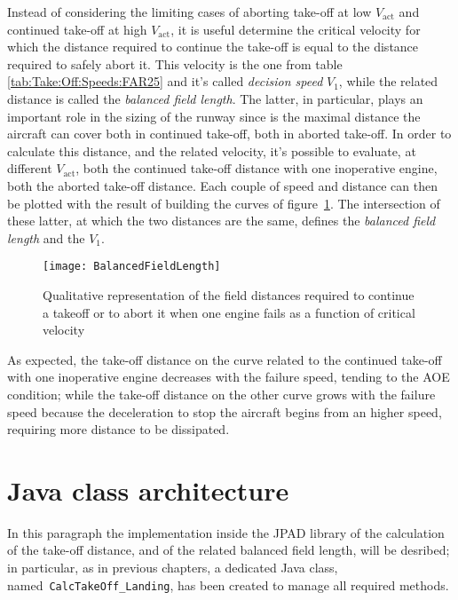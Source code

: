\bigskip
\noindent
Instead of considering the limiting cases of aborting take-off at low $V_{\text{act}}$ and continued take-off at high $V_{\text{act}}$, it is useful determine the critical velocity for which the distance required to continue the take-off is equal to the distance required to safely abort it. This velocity is the one from table \ref{tab:Take:Off:Speeds:FAR25} and it's called \emph{decision speed} $V_1$, while the related distance is called the \emph{balanced field length}. The latter, in particular, plays an important role in the sizing of the runway since is the maximal distance the aircraft can cover both in continued take-off, both in 
aborted take-off. 
%
In order to calculate this distance, and the related velocity, it's possible to evaluate, at different $V_{\text{act}}$,  both the continued take-off distance with one inoperative engine, both the aborted take-off distance. Each couple of speed and distance can then be plotted with the result of building the curves of figure~\ref{fig:BalancedFieldLength}. The intersection of these latter, at which the two distances are the same, defines the \emph{balanced field length} and the $V_1$.
%
\begin{figure}[H]
\centering
\texttt{[image: BalancedFieldLength]}
\caption{Qualitative representation of the field distances required to continue a takeoff or to abort it when one
engine fails as a function of critical velocity}
\label{fig:BalancedFieldLength}
\end{figure}
%
\noindent
As expected, the take-off distance on the curve related to the continued take-off with one inoperative engine decreases with the failure speed, tending to the AOE condition; while the take-off distance on the other curve grows with the failure speed because the deceleration to stop the aircraft begins from an higher speed, requiring more distance to be dissipated.
%
\section{Java class architecture}
%
In this paragraph the implementation inside the JPAD library of the calculation of the take-off distance, and of the related balanced field length, will be desribed; in particular, as in previous chapters, a dedicated Java class, named~\lstinline[language=Java]!CalcTakeOff_Landing!, has been created to manage all required methods.

